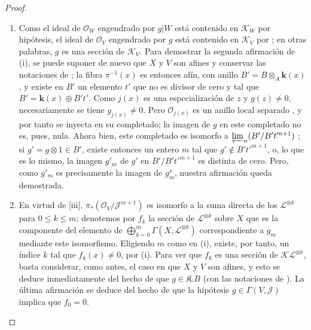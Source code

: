 \documentclass[oneside,10pt]{amsart}
\begin{document}
\begin{proof}
\begin{enumerate}
    \item[\rm{(i)}] Como el ideal de $\mathcal{O}_W$ engendrado por $g|W$ está contenido en $\mathcal{K}_W$ por hipótesis, el ideal de $\mathcal{O}_V$ engendrado por $g$ está contenido en $\mathcal{K}_V$ por ; en otras palabras, $g$ es una sección de $\mathcal{K}_V$.
        Para demostrar la segunda afirmación de (i), se puede suponer de nuevo que $X$ y $V$ son afines y conservar las notaciones de ;
        la fibra $\pi^{-1}(x)$ es entonces afín, con anillo $B'=B\otimes_A \boldsymbol{k}(x)$, y existe en $B'$ un elemento $t'$ que no es divisor de cero y tal que $B'=\boldsymbol{k}(x)\oplus B't'$.
        Como $j(x)$ es una especialización de $z$ y $g(z)\neq0$, necesariamente se tiene $g_{j(x)}\neq0$.
        Pero $\mathcal{O}_{j(x)}$ es un anillo local separado , y por tanto se inyecta en su completado; la imagen de $g$ en este completado no es, pues, nula.
        Ahora bien, este completado es isomorfo a $\varprojlim_n(B'/B't'^{n+1})$ ;
        si $g'=g\otimes1\in B'$, existe entonces un entero $m$ tal que $g'\notin B't'^{m+1}$, o, lo que es lo mismo, la imagen $g'_m$ de $g'$ en $B'/B't'^{m+1}$ es distinta de cero.
        Pero, como $g'_m$ es precisamente la imagen de $g_m^x$, nuestra afirmación queda demostrada.
    \item[\rm{(ii)}] En virtud de [iii], $\pi_*(\mathcal{O}_V/\mathcal{J}^{m+1})$ es isomorfo a la suma directa de los $\mathcal{L}^{\otimes k}$ para $0\leqslant k\leqslant m$;
        denotemos por $f_k$ la sección de $\mathcal{L}^{\otimes k}$ sobre $X$ que es la componente del elemento de $\bigoplus_{k=0}^m\Gamma(X,\mathcal{L}^{\otimes k})$ correspondiente a $g_m$ mediante este isomorfismo.
        Eligiendo $m$ como en (i), existe, por tanto, un índice $k$ tal que $f_k(x)\neq0$, por (i).
        Para ver que $f_k$ es una sección de $\mathcal{K}\mathcal{L}^{\otimes k}$, basta considerar, como antes, el caso en que $X$ y $V$ son afines, y esto se deduce inmediatamente del hecho de que $g\in\mathfrak{K}.B$ (con las notaciones de ).
        La última afirmación se deduce del hecho de que la hipótesis $g\in\Gamma(V,\mathcal{J})$ implica que $f_0=0$.
\end{enumerate}
\end{proof}
\end{document}
